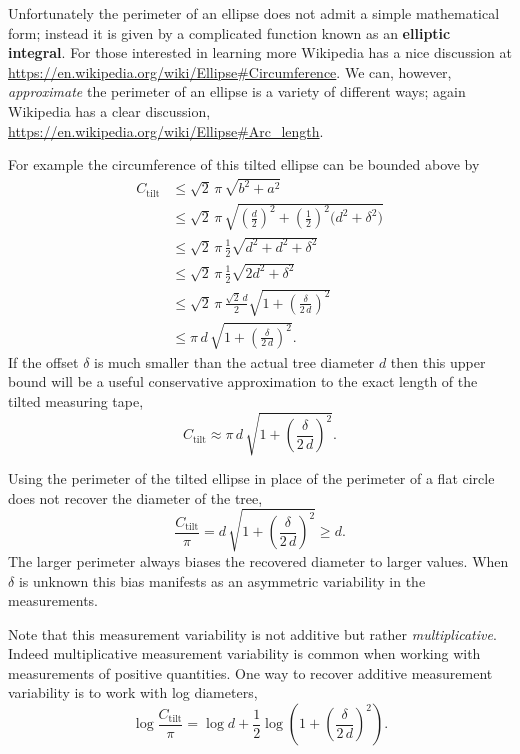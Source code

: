 \documentclass[
  letterpaper,
  DIV=11,
  numbers=noendperiod]{scrartcl}
\begin{document}
Unfortunately the perimeter of an ellipse does not admit a simple
mathematical form; instead it is given by a complicated function known
as an \textbf{elliptic integral}. For those interested in learning more
Wikipedia has a nice discussion at
\url{https://en.wikipedia.org/wiki/Ellipse\#Circumference}. We can,
however, \emph{approximate} the perimeter of an ellipse is a variety of
different ways; again Wikipedia has a clear discussion,
\url{https://en.wikipedia.org/wiki/Ellipse\#Arc_length}.

For example the circumference of this tilted ellipse can be bounded
above by \begin{align*}
C_{\mathrm{tilt}}
&\le
\sqrt{2} \, \pi \, \sqrt{ b^{2} + a^{2} }
\\
&\le
\sqrt{2} \, \pi \,
\sqrt{  \left( \frac{d}{2} \right)^{2}
      + \left(\frac{1}{2}\right)^{2} \bigg( d^{2} + \delta^{2} \bigg)
}
\\
&\le
\sqrt{2} \, \pi \, \frac{1}{2} \sqrt{ d^{2} + d^{2} + \delta^{2} }
\\
&\le
\sqrt{2} \, \pi \, \frac{1}{2} \sqrt{ 2 d^{2} + \delta^{2} }
\\
&\le
\sqrt{2} \, \pi \, \frac{\sqrt{2} \, d}{2}
\sqrt{ 1 + \left( \frac{\delta}{2 \, d} \right)^{2} }
\\
&\le
\pi \, d \, \sqrt{ 1 + \left( \frac{\delta}{2 \, d} \right)^{2} }.
\end{align*} If the offset \(\delta\) is much smaller than the actual
tree diameter \(d\) then this upper bound will be a useful conservative
approximation to the exact length of the tilted measuring tape, \[
C_{\mathrm{tilt}} \approx
\pi \, d \, \sqrt{ 1 + \left( \frac{\delta}{2 \, d} \right)^{2} }.
\]

Using the perimeter of the tilted ellipse in place of the perimeter of a
flat circle does not recover the diameter of the tree, \[
\frac{C_{\mathrm{tilt}}}{\pi}
=
d \, \sqrt{ 1 + \left( \frac{\delta}{2 \, d} \right)^{2} } \ge d.
\] The larger perimeter always biases the recovered diameter to larger
values. When \(\delta\) is unknown this bias manifests as an asymmetric
variability in the measurements.

Note that this measurement variability is not additive but rather
\emph{multiplicative}. Indeed multiplicative measurement variability is
common when working with measurements of positive quantities. One way to
recover additive measurement variability is to work with log diameters,
\[
\log \frac{C_{\mathrm{tilt}}}{\pi}
=
\log d
+ \frac{1}{2}
  \log \left( 1 + \left( \frac{\delta}{2 \, d} \right)^{2} \right).
\]
\end{document}
